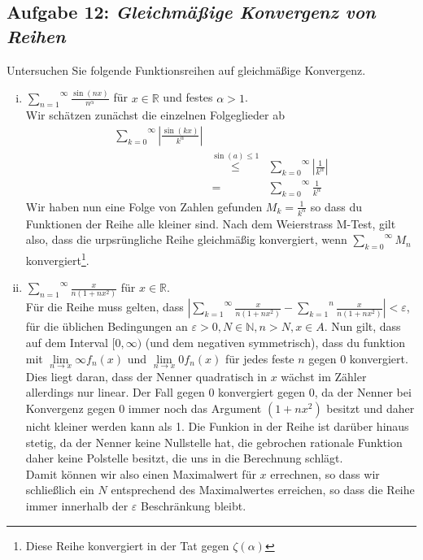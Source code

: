 \documentclass[11pt,a4paper,ngerman]{article}
\newcommand{\limes}[2][n]{\underset{ #1 \rightarrow #2}{\lim}}
\begin{document}
\subsection*{Aufgabe 12: \mdseries\itshape Gleichmäßige Konvergenz von Reihen}

Untersuchen Sie folgende Funktionsreihen auf gleichmäßige Konvergenz.

\begin{enumerate}[(i)]

    \item $\overset{\infty}{\underset{n=1}{\sum}} \frac{\sin(nx)}{n^\alpha}$ für $x\in\mathbb{R}$ und festes $\alpha > 1$.\\
        Wir schätzen zunächst die einzelnen Folgeglieder ab
        $$\begin{array}{rcl}
            \overset{\infty}{\underset{k=0}{\sum}} \left| \frac{\sin(kx)}{k^\alpha}\right| \\
                &\stackrel{\sin(a)\leq1}{\leq}&  
                    \overset{\infty}{\underset{k=0}{\sum}} \left| \frac{1}{k^\alpha}\right| \\
                &=& \overset{\infty}{\underset{k=0}{\sum}} \frac{1}{k^\alpha} 
        \end{array}$$
        Wir haben nun eine Folge von Zahlen gefunden $M_k = \frac{1}{k^\alpha}$ so dass
        du Funktionen der Reihe alle kleiner sind. Nach dem Weierstrass M-Test, gilt
        also, dass die urpsrüngliche Reihe gleichmäßig konvergiert, wenn 
        $\overset{\infty}{\underset{k=0}{\sum}} M_n$ konvergiert\footnote{Diese Reihe 
        konvergiert in der Tat gegen $\zeta(\alpha)$}.

    \item $\overset{\infty}{\underset{n=1}{\sum}} \frac{x}{n(1+nx^2)}$ für $x\in\mathbb{R}$.\\
        Für die Reihe muss gelten, dass $|\overset{\infty}{\underset{k=1}{\sum}} \frac{x}{n(1+nx^2)} - \overset{n}{\underset{k=1}{\sum}} \frac{x}{n(1+nx^2)}| < \varepsilon$,
        für die üblichen Bedingungen an $\varepsilon > 0, N \in \mathbb{N}, n > N , x \in A$. Nun gilt, dass auf dem Interval $[0,\infty)$ (und dem negativen
        symmetrisch), dass du funktion mit $\limes{x}{\infty} f_n(x)$ und $\limes{x}{0} f_n(x)$ für jedes feste $n$ gegen 0 konvergiert. Dies liegt
        daran, dass der Nenner quadratisch in $x$ wächst im Zähler allerdings nur linear. Der Fall gegen 0 konvergiert gegen 0, da der Nenner bei Konvergenz gegen 0
        immer noch das Argument $(1+nx^2)$ besitzt und daher nicht kleiner werden kann als 1. Die Funkion in der Reihe ist darüber hinaus stetig, da der Nenner
		keine Nullstelle hat, die gebrochen rationale Funktion daher keine Polstelle besitzt, die uns in die Berechnung schlägt.\\
		Damit können wir also einen Maximalwert für $x$ errechnen, so dass wir schließlich ein $N$ entsprechend des Maximalwertes erreichen, so dass die Reihe immer 
		innerhalb der $\varepsilon$ Beschränkung bleibt.
        

\end{enumerate}
\end{document}
